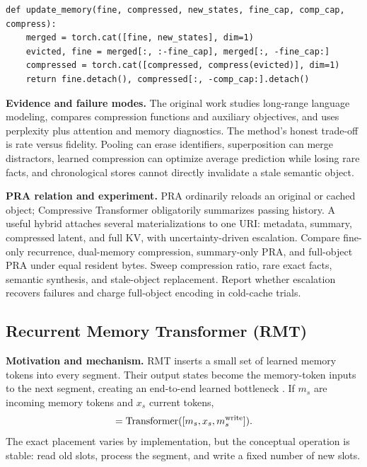 \begin{lstlisting}[caption={Two-tier chronological memory update}]
def update_memory(fine, compressed, new_states, fine_cap, comp_cap, compress):
    merged = torch.cat([fine, new_states], dim=1)
    evicted, fine = merged[:, :-fine_cap], merged[:, -fine_cap:]
    compressed = torch.cat([compressed, compress(evicted)], dim=1)
    return fine.detach(), compressed[:, -comp_cap:].detach()
\end{lstlisting}

\textbf{Evidence and failure modes.} The original work studies long-range language modeling,
compares compression functions and auxiliary objectives, and uses perplexity plus attention
and memory diagnostics.  The method's honest trade-off is rate versus fidelity.  Pooling can
erase identifiers, superposition can merge distractors, learned compression can optimize
average prediction while losing rare facts, and chronological stores cannot directly
invalidate a stale semantic object.

\textbf{PRA relation and experiment.} PRA ordinarily reloads an original or cached object;
Compressive Transformer obligatorily summarizes passing history.  A useful hybrid attaches
several materializations to one URI: metadata, summary, compressed latent, and full KV, with
uncertainty-driven escalation.  Compare fine-only recurrence, dual-memory compression,
summary-only PRA, and full-object PRA under equal resident bytes.  Sweep compression ratio,
rare exact facts, semantic synthesis, and stale-object replacement.  Report whether escalation
recovers failures and charge full-object encoding in cold-cache trials.

\subsection{Recurrent Memory Transformer (RMT)}

\textbf{Motivation and mechanism.} RMT inserts a small set of learned memory tokens into
every segment.  Their output states become the memory-token inputs to the next segment,
creating an end-to-end learned bottleneck \citep{bulatov2022rmt}.  If $m_s$ are incoming
memory tokens and $x_s$ current tokens,
\begin{equation}
[\hat m_s,H_s,m_{s+1}]=\operatorname{Transformer}([m_s,x_s,m_s^{\rm write}]).
\end{equation}
The exact placement varies by implementation, but the conceptual operation is stable:
read old slots, process the segment, and write a fixed number of new slots.

